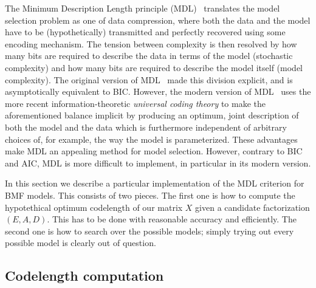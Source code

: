 \documentclass[twocolumn]{IEEEtran}
\theoremstyle{definition}
\begin{document}
The Minimum Description Length principle (MDL)~\cite{mdl1,mdl2,mdl3} translates the model selection problem as one of data compression, where both the data and the model have to be (hypothetically) transmitted and perfectly recovered using some encoding mechanism. The tension between complexity is then resolved by how many bits are required to describe the data in terms of the model (stochastic complexity) and how many bits are required to describe the model itself (model complexity). The original version of MDL~\cite{mdl1} made this division explicit, and is asymptotically equivalent to BIC. However, the modern version of MDL~\cite{mdl2,mdl3} uses the more recent information-theoretic \emph{universal coding theory} to make the aforementioned balance implicit by producing an optimum, joint description of both the model and the data which is furthermore independent of arbitrary choices of, for example, the way the model is parameterized. These advantages make MDL an appealing method for model selection. However, contrary to BIC and AIC, MDL is more difficult to implement, in particular in its modern version. 

In this section we describe a particular implementation of the MDL criterion for BMF models. This consists of two pieces. The first one is how to compute the hypotethical optimum codelength of our matrix $X$ given  a candidate factorization $(E,A,D)$. This has to be done with reasonable accuracy and efficiently. The second one is how to search over the possible models; simply trying out every possible model is clearly out of question.

\subsection{Codelength computation}
\end{document}
